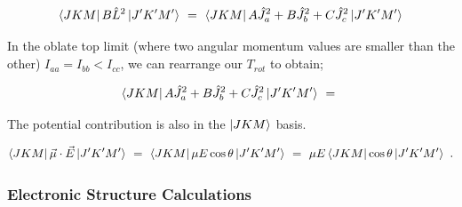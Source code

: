 \documentclass{article}
\begin{document}
\begin{equation} \label{eq:256}
\bra{J K M}B\hat{L}^{2}\ket{J' K' M'} \hspace{0.125cm} = \hspace{0.125cm} \bra{J K M} A \hat{J}_{a}^{2} + B \hat{J}_{b}^{2} + C \hat{J}_{c}^{2}\ket{J' K' M'}
\end{equation}

In the oblate top limit (where two angular momentum values are smaller than the other) \begin{math} I_{aa} = I_{bb} < I_{cc} \end{math}, we can rearrange our \begin{math} T_{rot} \end{math} to obtain;

\begin{equation} \label{eq:257}
\bra{J K M} A \hat{J}_{a}^{2} + B \hat{J}_{b}^{2} + C \hat{J}_{c}^{2}\ket{J' K' M'} \hspace{0.125cm} = \hspace{0.125cm} 
\end{equation}



The potential contribution is also in the \begin{math} \ket{J K M} \end{math} basis. 

\begin{equation} \label{eq:256}
\bra{J K M}\vec{\mu}\cdot\vec{E}\ket{J' K' M'} \hspace{0.125cm} = \hspace{0.125cm} \bra{J K M}\mu E\cos\theta\ket{J' K' M'} \hspace{0.125cm} = \hspace{0.125cm} \mu E\bra{J K M}\cos\theta\ket{J' K' M'} \hspace{0.125cm}.
\end{equation}











\subsubsection{Electronic Structure Calculations}
\end{document}
